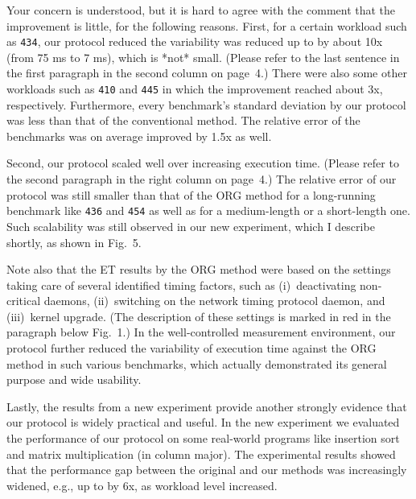 \documentclass[10pt,letterpaper]{article}
\newenvironment{myindentpar}[1]%
{\begin{list}{}
         {\vspace{10pt}
					\setlength{\leftmargin}{#1}}
          \item[]
}
{\end{list}}
\newcommand{\rev}[1]{\begin{myindentpar}{.25in} {\em {\color{blue}{#1}}}\end{myindentpar}}
\begin{document}

\rev{
(2) If the proposed approach is for a generic purpose, there is a strong
doubt about usability. The improvement of the SEDONA is little. And the
extent of the each benchmark’s improvement described in Table 3
varies widely. Thus, the experimental results does not confirm whether
the SEDONA is widely practical or is useful. The description to clarify
the SEDONA’s characteristics is needed.
} 

Your concern is understood, but it is hard to agree with the comment that the improvement is little, for the following reasons.
First, for a certain workload such as {\tt 434}, 
our protocol reduced the variability was reduced up to by about 10x (from 75 ms to 7 ms), 
which is *not* small. (Please refer to the last sentence 
in the first paragraph in the second column on page~4.)
There were also some other workloads such as {\tt 410} and {\tt 445} 
in which the improvement reached about 3x, respectively. 
Furthermore, every benchmark's standard deviation by our protocol 
was less than that of the conventional method. 
The relative error of the benchmarks was on average improved 
by 1.5x as well.

Second, our protocol scaled well over increasing execution time. 
(Please refer to the second paragraph in the right column on page~4.)
The relative error of our protocol was still smaller than that of the ORG method 
for a long-running benchmark like {\tt 436} and {\tt 454} 
as well as for a medium-length or a short-length one. 
Such scalability was still observed in our new experiment, 
which I describe shortly, as shown in Fig.~5.

Note also that the ET results by the ORG method were based 
on the settings taking care of several identified timing factors, such as
(i)~deactivating non-critical daemons, 
(ii)~switching on the network timing protocol daemon, and 
(iii)~kernel upgrade. 
(The description of these settings is marked in red in the paragraph below Fig.~1.) 
In the well-controlled measurement environment, our protocol further 
reduced the variability of execution time against the ORG method
in such various benchmarks, which actually demonstrated its general purpose and wide usability. 

Lastly, the results from a new experiment provide 
another strongly evidence that our protocol is widely practical and useful. 
In the new experiment we evaluated the performance of our protocol 
on some real-world programs like insertion sort and matrix multiplication (in column major). 
The experimental results showed that the performance gap between the original and our methods 
was increasingly widened, e.g., up to by 6x, as workload level increased. 
\end{document}
